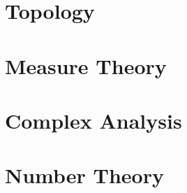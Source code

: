 \documentclass[11pt,a4paper]{colorart}
\numberwithin{equation}{section}
\begin{document}
\part{Topology}


\newpage
\part{Measure Theory}






\newpage
\part{Complex Analysis}


\newpage
\part{Number Theory}



\end{document}
